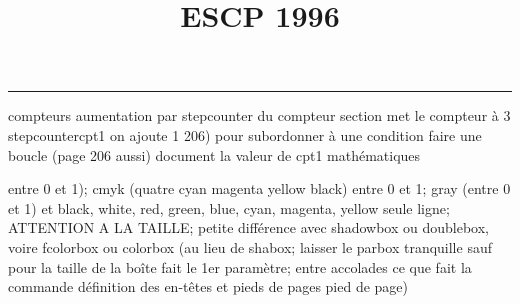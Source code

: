 \documentclass[11pt]{article}%
\title{\bf \vspace{-2cm} ESCP 1996} %
\author{} %
\date{} %
\renewcommand{\headrulewidth}{0pt}%
\renewcommand{\footrulewidth}{0.4pt}%
\begin{document}
\maketitle %
\vspace{-1.4cm}\hrule %
\thispagestyle{fancy}

\vspace*{.2cm}



compteurs%
aumentation par stepcounter du compteur section%
met le compteur à 3%
stepcounter{cpt1} on ajoute 1%
206) pour subordonner à une condition %
faire une boucle (page 206 aussi) %
document la valeur de cpt1 
mathématiques\newcommand{\ch}{\operatorname{ch}} 
\newcommand{\sh}{\operatorname{sh}}
\renewcommand{\tanh}{\operatorname{th}}
\renewcommand{\sinh}{\operatorname{sh}}
\renewcommand{\cosh}{\operatorname{ch}}
\newcommand{\argsh}{\operatorname{argsh}}
\newcommand{\argch}{\operatorname{argch}}
\newcommand{\argth}{\operatorname{argth}}
\newcommand{\ker}{\operatorname{Ker}}
\renewcommand{\im}{\operatorname{Im}}
\newcommand{\rg}{\operatorname{rg}}
\newcommand{\Id}{\operatorname{Id}}
\newcommand{\id}{\operatorname{id}}
\renewcommand{\leq}{\leq}
\renewcommand{\geq}{\geq }

entre 0 et 1); cmyk (quatre cyan magenta yellow black) entre 0 et 1;
gray (entre 0 et 1) et black, white, red, green, blue, cyan, magenta,
yellow%
seule ligne; ATTENTION A LA TAILLE; petite différence avec shadowbox ou
doublebox, voire fcolorbox ou colorbox (au lieu de shabox; laisser le
parbox tranquille sauf pour la taille de la boîte
\newcommand{\Tbox}[1]{\begin{center} \shabox{\parbox{0.6
\linewidth}{#1}} \end{center}} %
fait le 1er paramètre; entre accolades ce que fait la commande
définition des en-têtes et pieds de pages\pagestyle{fancy}
\chead{}
\rfoot[ \ \thepage]{\thepage}
\cfoot{}
\lfoot{}
\thispagestyle{fancy} %
pied de page)\renewcommand{\footrulewidth}{0.4pt}
\renewcommand{\headrulewidth}{0.4pt}
\end{document}
